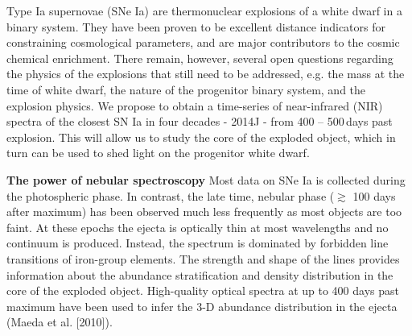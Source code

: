 \documentclass[11pt]{article}
\begin{document}
\sciencejustification    %
Type Ia supernovae (SNe Ia) are thermonuclear explosions of a white dwarf in a binary system. They have been proven to be excellent distance indicators for constraining cosmological parameters, and are major contributors to the cosmic chemical enrichment. There remain, however, several open questions regarding the physics of the explosions that still need to be addressed, e.g. the mass at the time of white dwarf, the nature of the progenitor binary system, and the explosion physics. We propose to obtain a time-series of near-infrared (NIR) spectra of the closest SN Ia in four decades - 2014J - from 400 -- 500\,days past explosion. This will allow us to study the core of the exploded object, which in turn can be used to shed light on the progenitor white dwarf. 

\textbf{The power of nebular spectroscopy} Most data on SNe Ia is collected during the photospheric phase. In contrast, the late time, nebular phase ($\gtrsim$ 100 days after maximum) has been observed much less frequently as most objects are too faint. At these epochs the ejecta is optically thin at most wavelengths and no continuum is produced. Instead, the spectrum is dominated by forbidden line transitions of iron-group elements. The strength and shape of the lines provides information about the abundance stratification and density distribution in the core of the exploded object. High-quality optical spectra at up to 400 days past maximum have been used to infer the 3-D abundance distribution in the ejecta (Maeda et al. [2010]).
\end{document}

